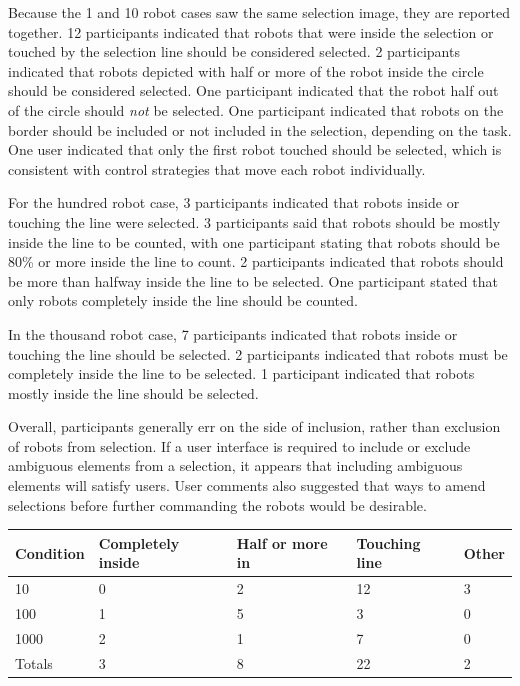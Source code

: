 Because the 1 and 10 robot cases saw the same selection image, they are reported together. 
12 participants indicated that robots that were inside the selection or touched by the selection line should be considered selected. 
2 participants indicated that robots depicted with half or more of the robot inside the circle should be considered selected. 
One participant indicated that the robot half out of the circle should \emph{not} be selected. 
One participant indicated that robots on the border should be included or not included in the selection, depending on the task. 
One user indicated that only the first robot touched should be selected, which is consistent with control strategies that move each robot individually. 

For the hundred robot case, 3 participants indicated that robots inside or touching the line were selected. 
3 participants said that robots should be mostly inside the line to be counted, with one participant stating that robots should be 80\% or more inside the line to count. 
2 participants indicated that robots should be more than halfway inside the line to be selected. 
One participant stated that only robots completely inside the line should be counted. 

In the thousand robot case, 7 participants indicated that robots inside or touching the line should be selected. 
2 participants indicated that robots must be completely inside the line to be selected. 
1 participant indicated that robots mostly inside the line should be selected. 

Overall, participants generally err on the side of inclusion, rather than exclusion of robots from selection.
If a user interface is required to include or exclude ambiguous elements from a selection, it appears that including ambiguous elements will satisfy users. 
User comments also suggested that ways to amend selections before further commanding the robots would be desirable.

\begin{tabular}{ l l l l l}
	Condition & Completely inside & Half or more in & Touching line & Other\\
	\hline
	10 & 0 & 2 & 12 & 3 \\
	
	100 & 1 & 5 & 3 & 0 \\
	1000 & 2 & 1 & 7 & 0\\
	\hline
	Totals & 3 & 8 & 22 & 2 \\
\end{tabular}

